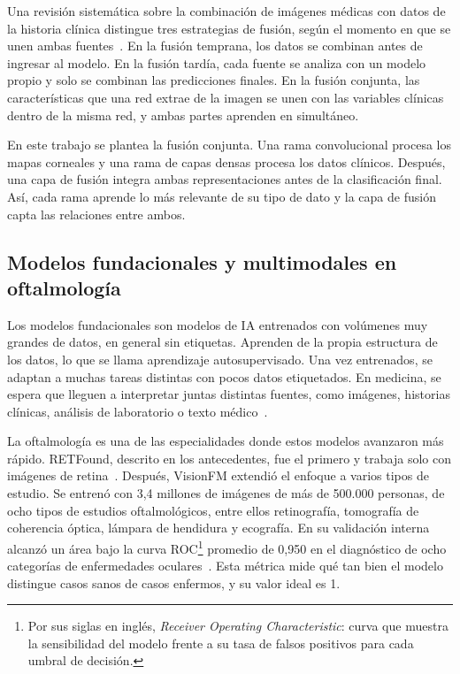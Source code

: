         Una revisión sistemática sobre la combinación de imágenes médicas con datos de la historia clínica distingue tres estrategias de fusión, según el momento en que se unen ambas fuentes~\cite{huang_fusion}. En la fusión temprana, los datos se combinan antes de ingresar al modelo. En la fusión tardía, cada fuente se analiza con un modelo propio y solo se combinan las predicciones finales. En la fusión conjunta, las características que una red extrae de la imagen se unen con las variables clínicas dentro de la misma red, y ambas partes aprenden en simultáneo.

        En este trabajo se plantea la fusión conjunta. Una rama convolucional procesa los mapas corneales y una rama de capas densas procesa los datos clínicos. Después, una capa de fusión integra ambas representaciones antes de la clasificación final. Así, cada rama aprende lo más relevante de su tipo de dato y la capa de fusión capta las relaciones entre ambos.

    \subsection{Modelos fundacionales y multimodales en oftalmología}

        Los modelos fundacionales son modelos de IA entrenados con volúmenes muy grandes de datos, en general sin etiquetas. Aprenden de la propia estructura de los datos, lo que se llama aprendizaje autosupervisado. Una vez entrenados, se adaptan a muchas tareas distintas con pocos datos etiquetados. En medicina, se espera que lleguen a interpretar juntas distintas fuentes, como imágenes, historias clínicas, análisis de laboratorio o texto médico~\cite{moor_gmai}.

        La oftalmología es una de las especialidades donde estos modelos avanzaron más rápido. RETFound, descrito en los antecedentes, fue el primero y trabaja solo con imágenes de retina~\cite{retfound}. Después, VisionFM extendió el enfoque a varios tipos de estudio. Se entrenó con 3,4 millones de imágenes de más de 500.000 personas, de ocho tipos de estudios oftalmológicos, entre ellos retinografía, tomografía de coherencia óptica, lámpara de hendidura y ecografía. En su validación interna alcanzó un área bajo la curva ROC\footnote{Por sus siglas en inglés, \textit{Receiver Operating Characteristic}: curva que muestra la sensibilidad del modelo frente a su tasa de falsos positivos para cada umbral de decisión.} promedio de 0,950 en el diagnóstico de ocho categorías de enfermedades oculares~\cite{visionfm}. Esta métrica mide qué tan bien el modelo distingue casos sanos de casos enfermos, y su valor ideal es 1.

